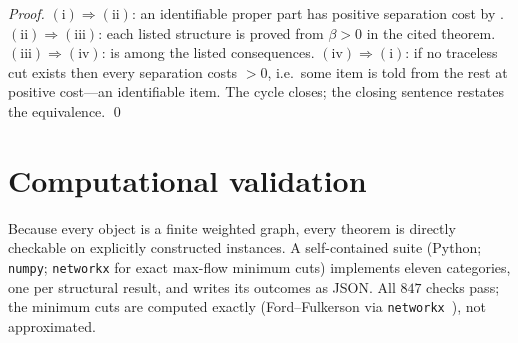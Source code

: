 \documentclass[11pt,a4paper]{article}
\theoremstyle{thmstyle}
\theoremstyle{definition}
\theoremstyle{remark}
\newcommand{\flo}{\beta}                 %
\begin{document}
\begin{proof}
$(\mathrm{i})\Rightarrow(\mathrm{ii})$: an identifiable proper part has
positive separation cost by .
$(\mathrm{ii})\Rightarrow(\mathrm{iii})$: each listed structure is proved
from $\flo>0$ in the cited theorem.
$(\mathrm{iii})\Rightarrow(\mathrm{iv})$:  is among the
listed consequences. $(\mathrm{iv})\Rightarrow(\mathrm{i})$: if no traceless
cut exists then every separation costs $>0$, i.e.\ some item is told from
the rest at positive cost---an identifiable item. The cycle closes; the
closing sentence restates the equivalence. \qed
\end{proof}

\section{Computational validation}
\label{sec:validation}

Because every object is a finite weighted graph, every theorem is directly
checkable on explicitly constructed instances. A self-contained suite
(Python; \texttt{numpy}; \texttt{networkx} for exact max-flow minimum
cuts) implements eleven categories, one per structural result, and writes
its outcomes as JSON. All $847$ checks pass; the minimum cuts are computed
exactly (Ford--Fulkerson via \texttt{networkx}~\citep{fordfulkerson1956}),
not approximated.
\end{document}
